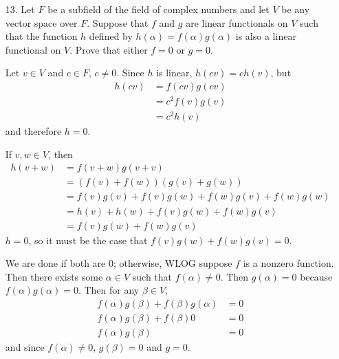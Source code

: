 \documentclass{article}
\begin{document}
\begin{enumerate}[listparindent=\parindent]
\item[13.] Let \(F\) be a subfield of the field of complex numbers and let \(V\) be any vector space over \(F\).
    Suppose that \(f\) and \(g\) are linear functionals on \(V\) such that the function \(h\) defined by \(h(\alpha) = f(\alpha)g(\alpha)\) is also a linear functional on \(V\).
    Prove that either \(f = 0\) or \(g = 0\).

    Let \(v \in V\) and \(c \in F\), \(c \neq 0\). Since \(h\) is linear, \(h(cv) = ch(v)\), but
    \begin{align*}
        h(cv) &= f(cv)g(cv) \\
              &= c^2f(v)g(v) \\
              &= c^2h(v)
    \end{align*}
    and therefore \(h = 0\).

    If \(v, w \in V\), then
    \begin{align*}
        h(v+w) &= f(v+w)g(v+v) \\
               &= (f(v) + f(w))(g(v) + g(w)) \\
               &= f(v)g(v) + f(v)g(w) + f(w)g(v) + f(w)g(w) \\
               &= h(v) + h(w) + f(v)g(w) + f(w)g(v) \\
               &= f(v)g(w) + f(w)g(v)
    \end{align*}
    \(h = 0\), so it must be the case that \(f(v)g(w) + f(w)g(v) = 0\).

    We are done if both are 0; otherwise, WLOG suppose \(f\) is a nonzero function.
    Then there exists some \(\alpha \in V\) such that \(f(\alpha) \neq 0\). Then \(g(\alpha) = 0\) because \(f(\alpha)g(\alpha) = 0\).
    Then for any \(\beta \in V\),
    \begin{align*}
        f(\alpha)g(\beta) + f(\beta)g(\alpha) &= 0 \\
        f(\alpha)g(\beta) + f(\beta)0 &= 0 \\
        f(\alpha)g(\beta) &= 0
    \end{align*}
    and since \(f(\alpha) \neq 0\), \(g(\beta) = 0\) and \(g = 0\).

\end{enumerate}
\end{document}
